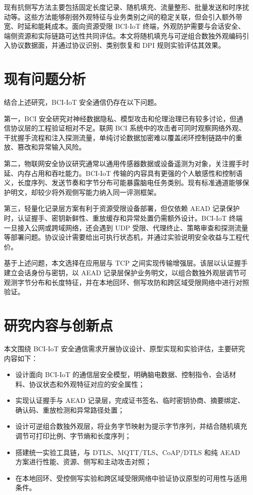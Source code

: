 现有抗侧写方法主要包括固定长度记录、随机填充、流量整形、批量发送和时序扰动等。这些方法能够削弱外观特征与业务类别之间的稳定关联，但会引入额外带宽、时延和能耗成本。面向资源受限 BCI-IoT 终端，外观防护需要与会话安全、端侧资源和实际链路可达性共同评估。本文将随机填充与可逆组合数独外观编码引入协议数据面，并通过协议识别、类别恢复和 DPI 规则实验评估其效果。

\section{现有问题分析}
结合上述研究，BCI-IoT 安全通信仍存在以下问题。

第一，BCI 安全研究对神经数据隐私、模型攻击和伦理治理已有较多讨论，但通信协议层的工程验证相对不足。联网 BCI 系统中的攻击者可同时观察网络外观、干扰握手流程和注入探测流量，单纯讨论数据加密难以覆盖闭环控制链路中的重放、篡改和异常输入风险。

第二，物联网安全协议研究通常以通用传感器数据或设备遥测为对象，关注握手时延、内存占用和吞吐能力。BCI-IoT 传输的内容具有更强的个人敏感性和控制语义，长度序列、发送节奏和字节分布可能暴露脑电任务类别。现有标准通道能够保护明文，却较少将外观侧写能力纳入同一评测框架。

第三，轻量化记录层方案有利于资源受限设备部署，但仅依赖 AEAD 记录保护时，认证握手、密钥新鲜性、重放缓存和异常处置仍需额外设计。BCI-IoT 终端一旦接入公网或跨域网络，还会遇到 UDP 受限、代理终止、策略审查和探测流量等部署问题。协议设计需要给出可执行状态机，并通过实验说明安全收益与工程代价。

基于上述问题，本文选择在应用层与 TCP 之间实现传输增强层。该层以认证握手建立会话身份与密钥，以 AEAD 记录层保护业务明文，以组合数独外观层调节可观测字节分布和长度特征，并在本地回环、侧写攻防和跨区域受限网络中进行对照验证。

\section{研究内容与创新点}
本文围绕 BCI-IoT 安全通信需求开展协议设计、原型实现和实验评估，主要研究内容如下：
\begin{itemize}
  \item 设计面向 BCI-IoT 的通信层安全模型，明确脑电数据、控制指令、会话材料、协议状态和外观特征对应的安全属性；
  \item 实现认证握手与 AEAD 记录层，完成证书签名、临时密钥协商、摘要绑定、确认码、重放检测和异常路径处置；
  \item 设计可逆组合数独外观层，将业务字节映射为提示字节序列，并结合随机填充调节可打印比例、字节熵和长度序列；
  \item 搭建统一实验工具链，与 DTLS、MQTT/TLS、CoAP/DTLS 和纯 AEAD 方案进行性能、资源、侧写和主动攻击对照；
  \item 在本地回环、受控侧写实验和跨区域受限网络中验证协议原型的可用性与适用条件。
\end{itemize}

